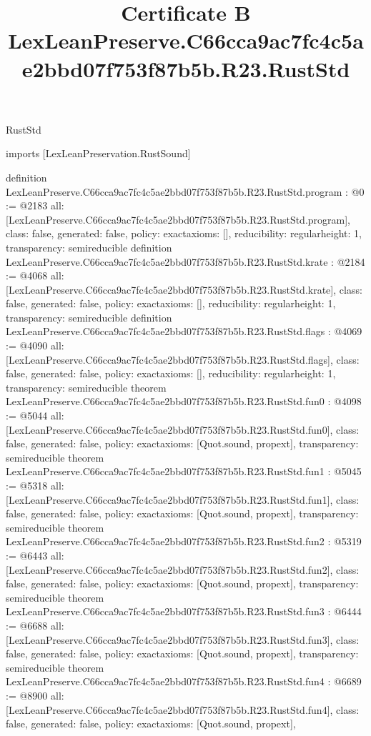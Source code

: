 \begin{lexlean}{RustStd}
\title{Certificate B LexLeanPreserve.C66cca9ac7fc4c5ae2bbd07f753f87b5b.R23.RustStd}
\begin{coremodule}
imports [LexLeanPreservation.RustSound]

definition LexLeanPreserve.C66cca9ac7fc4c5ae2bbd07f753f87b5b.R23.RustStd.program : @0 := @2183 {
  all: [LexLeanPreserve.C66cca9ac7fc4c5ae2bbd07f753f87b5b.R23.RustStd.program],
  class: false,
  generated: false,
  policy: exact{axioms: []},
  reducibility: regular{height: 1},
  transparency: semireducible
}
definition LexLeanPreserve.C66cca9ac7fc4c5ae2bbd07f753f87b5b.R23.RustStd.krate : @2184 := @4068 {
  all: [LexLeanPreserve.C66cca9ac7fc4c5ae2bbd07f753f87b5b.R23.RustStd.krate],
  class: false,
  generated: false,
  policy: exact{axioms: []},
  reducibility: regular{height: 1},
  transparency: semireducible
}
definition LexLeanPreserve.C66cca9ac7fc4c5ae2bbd07f753f87b5b.R23.RustStd.flags : @4069 := @4090 {
  all: [LexLeanPreserve.C66cca9ac7fc4c5ae2bbd07f753f87b5b.R23.RustStd.flags],
  class: false,
  generated: false,
  policy: exact{axioms: []},
  reducibility: regular{height: 1},
  transparency: semireducible
}
theorem LexLeanPreserve.C66cca9ac7fc4c5ae2bbd07f753f87b5b.R23.RustStd.fun0 : @4098 := @5044 {
  all: [LexLeanPreserve.C66cca9ac7fc4c5ae2bbd07f753f87b5b.R23.RustStd.fun0],
  class: false,
  generated: false,
  policy: exact{axioms: [Quot.sound, propext]},
  transparency: semireducible
}
theorem LexLeanPreserve.C66cca9ac7fc4c5ae2bbd07f753f87b5b.R23.RustStd.fun1 : @5045 := @5318 {
  all: [LexLeanPreserve.C66cca9ac7fc4c5ae2bbd07f753f87b5b.R23.RustStd.fun1],
  class: false,
  generated: false,
  policy: exact{axioms: [Quot.sound, propext]},
  transparency: semireducible
}
theorem LexLeanPreserve.C66cca9ac7fc4c5ae2bbd07f753f87b5b.R23.RustStd.fun2 : @5319 := @6443 {
  all: [LexLeanPreserve.C66cca9ac7fc4c5ae2bbd07f753f87b5b.R23.RustStd.fun2],
  class: false,
  generated: false,
  policy: exact{axioms: [Quot.sound, propext]},
  transparency: semireducible
}
theorem LexLeanPreserve.C66cca9ac7fc4c5ae2bbd07f753f87b5b.R23.RustStd.fun3 : @6444 := @6688 {
  all: [LexLeanPreserve.C66cca9ac7fc4c5ae2bbd07f753f87b5b.R23.RustStd.fun3],
  class: false,
  generated: false,
  policy: exact{axioms: [Quot.sound, propext]},
  transparency: semireducible
}
theorem LexLeanPreserve.C66cca9ac7fc4c5ae2bbd07f753f87b5b.R23.RustStd.fun4 : @6689 := @8900 {
  all: [LexLeanPreserve.C66cca9ac7fc4c5ae2bbd07f753f87b5b.R23.RustStd.fun4],
  class: false,
  generated: false,
  policy: exact{axioms: [Quot.sound, propext]},
}
\end{coremodule}
\end{lexlean}
